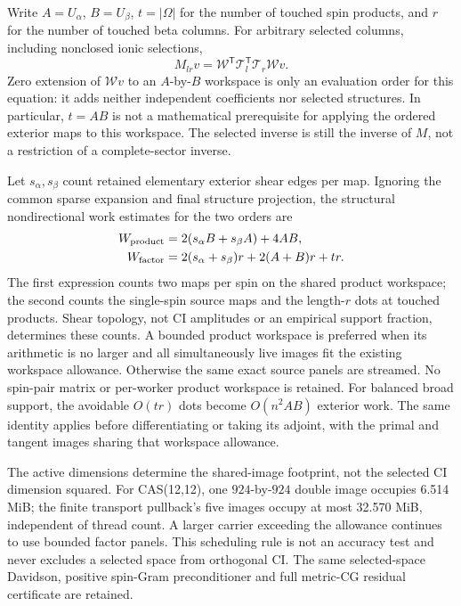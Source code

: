 \documentclass[11pt,a4paper]{article}
\newcommand{\Tr}{^{\mathsf T}}
\newcommand{\Wa}{\mathcal W}
\newcommand{\Ta}{\mathcal T}
\begin{document}
Write $A=U_\alpha$, $B=U_\beta$, $t=|\Omega|$ for the number
of touched spin products, and $r$ for the number of touched beta columns.
For arbitrary selected columns, including nonclosed ionic selections,
\begin{equation}
 M_{lr}v=\Wa\Tr\Ta_l\Tr\Ta_r\Wa v.
 \label{eq:selected-metric-order}
\end{equation}
Zero extension of $\Wa v$ to an $A$-by-$B$ workspace is only an
evaluation order for this equation: it adds neither independent coefficients
nor selected structures. In particular, $t=AB$ is not a mathematical
prerequisite for applying the ordered exterior maps to this workspace.
The selected inverse is still the inverse of $M$, not a restriction of
a complete-sector inverse.

Let $s_\alpha,s_\beta$ count retained elementary exterior shear edges per map.
Ignoring the common sparse expansion and final structure projection,
the structural nondirectional work estimates for the two orders are
\begin{align}
 W_{\rm product}&=2(s_\alpha B+s_\beta A)+4AB,\\
 W_{\rm factor}&=2(s_\alpha+s_\beta)r+2(A+B)r+tr.
\end{align}
The first expression counts two maps per spin on the shared product
workspace; the second counts the single-spin source maps and the
length-$r$ dots at touched products. Shear topology, not CI amplitudes
or an empirical support fraction, determines these counts. A bounded
product workspace is preferred when its arithmetic is no larger and all
simultaneously live images fit the existing workspace allowance. Otherwise
the same exact source panels are streamed. No spin-pair matrix or
per-worker product workspace is retained. For balanced broad support,
the avoidable $O(tr)$ dots become $O(n^2AB)$ exterior work. The same
identity applies before differentiating or taking its adjoint, with the
primal and tangent images sharing that workspace allowance.

The active dimensions determine the shared-image footprint, not the selected
CI dimension squared. For CAS(12,12), one $924$-by-$924$ double image occupies
6.514 MiB; the finite transport pullback's five images occupy at most 32.570
MiB, independent of thread count. A larger carrier exceeding the allowance
continues to use bounded factor panels. This scheduling rule is not an
accuracy test and never excludes a selected space from orthogonal CI.
The same selected-space Davidson, positive spin-Gram preconditioner and
full metric-CG residual certificate are retained.
\end{document}
